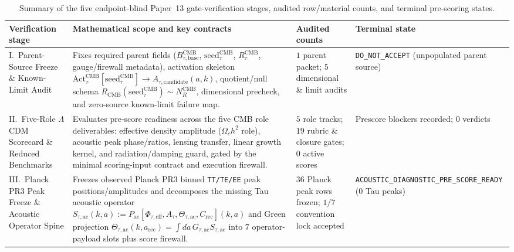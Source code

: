 \documentclass[11pt]{article}
\begin{document}
\begin{table}[ht!]
\centering
\caption{Summary of the five endpoint-blind Paper~13 gate-verification stages, audited row/material counts, and terminal pre-scoring states.}
\label{tab:paper13-gate-architecture}
\footnotesize
\renewcommand{\arraystretch}{1.18}
\begin{tabularx}{\textwidth}{@{}>{ \raggedright\arraybackslash }p{2.7cm} >{ \raggedright\arraybackslash }X >{ \raggedright\arraybackslash }p{2.5cm} >{ \raggedright\arraybackslash }p{3.0cm}@{}}
\toprule
\textbf{Verification stage} & \textbf{Mathematical scope and key contracts} & \textbf{Audited counts} & \textbf{Terminal state} \\
\midrule
I.\ Parent-Source Freeze \& Known-Limit Audit & Fixes required parent fields ($B_{\tau,\mathrm{base}}^{\mathrm{CMB}}$, $\mathrm{seed}_\tau^{\mathrm{CMB}}$, $R_\tau^{\mathrm{CMB}}$, gauge/firewall metadata), activation skeleton $\mathrm{Act}_\tau^{\mathrm{CMB}}[\mathrm{seed}_\tau^{\mathrm{CMB}}]\to A_{\tau,\mathrm{candidate}}(a,k)$, quotient/null schema $R_{\mathrm{CMB}}(\mathrm{seed}_\tau^{\mathrm{CMB}})\sim N_R^{\mathrm{CMB}}$, dimensional precheck, and zero-source known-limit failure map. & $1$ parent packet; $5$ dimensional \& limit audits & \texttt{DO\_\allowbreak{}NOT\_\allowbreak{}ACCEPT} (unpopulated parent source) \\
II.\ Five-Role $\Lambda$CDM Scorecard \& Reduced Benchmarks & Evaluates pre-score readiness across the five CMB role deliverables: effective density amplitude ($\Omega_c h^2$ role), acoustic peak phase/ratios, lensing transfer, linear growth kernel, and radiation/damping guard, gated by the minimal scoring-input contract and execution firewall. & $5$ role tracks; $19$ rubric \& closure gates; $0$ active scores & Prescore blockers recorded; $0$ verdicts \\
III.\ Planck PR3 Peak Freeze \& Acoustic Operator Spine & Freezes observed Planck PR3 binned \texttt{TT/TE/EE} peak positions/amplitudes and decomposes the missing Tau acoustic operator $S_{\tau,\mathrm{ac}}(k,a):=P_{\mathrm{ac}}[\Phi_{\tau,\mathrm{eff}},A_\tau,\Theta_{\tau,\mathrm{ac}},C_{\mathrm{rec}}](k,a)$ and Green projection $\Theta_{\tau,\mathrm{ac}}(k,a_{\mathrm{rec}})=\int da\,G_{\tau,\mathrm{ac}}S_{\tau,\mathrm{ac}}$ into $7$ operator-payload slots plus score firewall. & $36$ Planck peak rows frozen; $1/7$ convention lock accepted & \texttt{ACOUSTIC\_\allowbreak{}DIAGNOSTIC\_\allowbreak{}PRE\_\allowbreak{}SCORE\_\allowbreak{}READY} ($0$ Tau peaks) \\

\end{tabularx}
\end{table}
\end{document}
